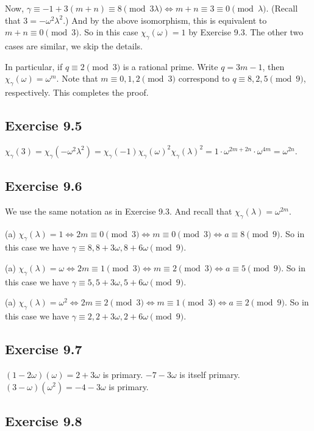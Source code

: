 \documentclass[../I&R.tex]{subfiles}
\begin{document}
Now, $\gamma\equiv-1+3(m+n)\equiv8\pmod{3\lambda} \iff m+n\equiv3\equiv0\pmod{\lambda}$. (Recall that $3=-\omega^2\lambda^2$.) And by the above isomorphism, this is equivalent to $m+n\equiv0\pmod{3}$. So in this case $\chi_\gamma(\omega)=1$ by Exercise 9.3. The other two cases are similar, we skip the details.

In particular, if $q\equiv2\pmod{3}$ is a rational prime. Write $q=3m-1$, then $\chi_\gamma(\omega)=\omega^m$. Note that $m\equiv0,1,2\pmod{3}$ correspond to $q\equiv8,2,5\pmod{9}$, respectively. This completes the proof.

\subsection*{Exercise 9.5}

$\chi_\gamma(3)=\chi_\gamma(-\omega^2\lambda^2)=\chi_\gamma(-1)\chi_\gamma(\omega)^2\chi_\gamma(\lambda)^2=1\cdot\omega^{2m+2n}\cdot\omega^{4m}=\omega^{2n}$.

\subsection*{Exercise 9.6}

We use the same notation as in Exercise 9.3. And recall that $\chi_\gamma(\lambda)=\omega^{2m}$.

(a) $\chi_\gamma(\lambda)=1 \iff 2m\equiv0\pmod{3} \iff m\equiv0\pmod{3} \iff a\equiv8\pmod{9}$. So in this case we have $\gamma\equiv8,8+3\omega,8+6\omega\pmod{9}$.

(a) $\chi_\gamma(\lambda)=\omega \iff 2m\equiv1\pmod{3} \iff m\equiv2\pmod{3} \iff a\equiv5\pmod{9}$. So in this case we have $\gamma\equiv5,5+3\omega,5+6\omega\pmod{9}$.

(a) $\chi_\gamma(\lambda)=\omega^2 \iff 2m\equiv2\pmod{3} \iff m\equiv1\pmod{3} \iff a\equiv2\pmod{9}$. So in this case we have $\gamma\equiv2,2+3\omega,2+6\omega\pmod{9}$.

\subsection*{Exercise 9.7}

$(1-2\omega)(\omega)=2+3\omega$ is primary. $-7-3\omega$ is itself primary. $(3-\omega)(\omega^2)=-4-3\omega$ is primary.

\subsection*{Exercise 9.8}
\end{document}
